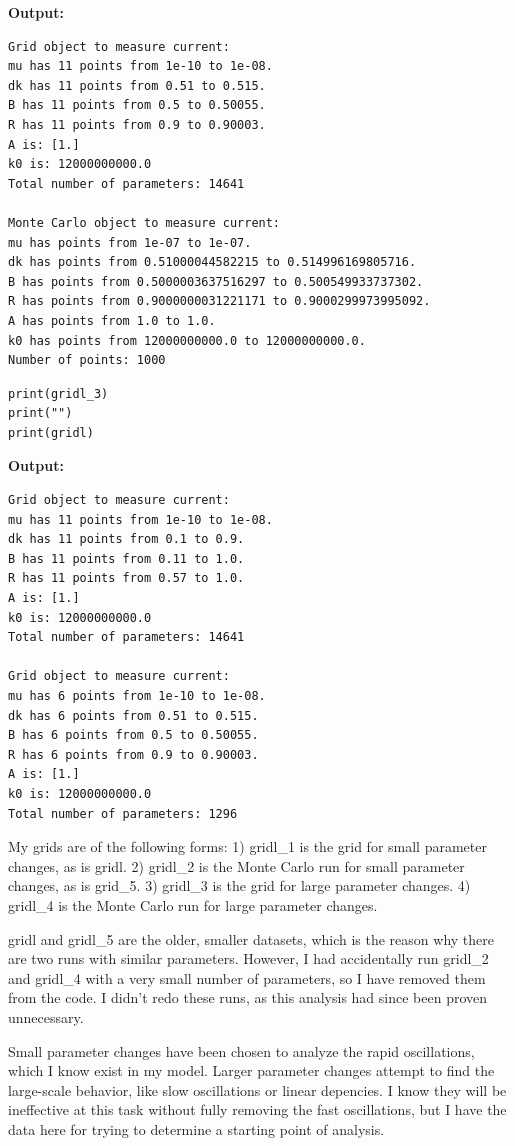 \documentclass{article}
\begin{document}
\textbf{Output:}\begin{verbatim}
Grid object to measure current:
mu has 11 points from 1e-10 to 1e-08.
dk has 11 points from 0.51 to 0.515.
B has 11 points from 0.5 to 0.50055.
R has 11 points from 0.9 to 0.90003.
A is: [1.]
k0 is: 12000000000.0
Total number of parameters: 14641

Monte Carlo object to measure current:
mu has points from 1e-07 to 1e-07.
dk has points from 0.51000044582215 to 0.514996169805716.
B has points from 0.5000003637516297 to 0.500549933737302.
R has points from 0.9000000031221171 to 0.9000299973995092.
A has points from 1.0 to 1.0.
k0 has points from 12000000000.0 to 12000000000.0.
Number of points: 1000

\end{verbatim}

\begin{lstlisting}
print(gridl_3)
print("")
print(gridl)\end{lstlisting}

\textbf{Output:}\begin{verbatim}
Grid object to measure current:
mu has 11 points from 1e-10 to 1e-08.
dk has 11 points from 0.1 to 0.9.
B has 11 points from 0.11 to 1.0.
R has 11 points from 0.57 to 1.0.
A is: [1.]
k0 is: 12000000000.0
Total number of parameters: 14641

Grid object to measure current:
mu has 6 points from 1e-10 to 1e-08.
dk has 6 points from 0.51 to 0.515.
B has 6 points from 0.5 to 0.50055.
R has 6 points from 0.9 to 0.90003.
A is: [1.]
k0 is: 12000000000.0
Total number of parameters: 1296

\end{verbatim}

My grids are of the following forms:
 1) gridl\_1 is the grid for small parameter changes, as is gridl.
 2) gridl\_2 is the Monte Carlo run for small parameter changes, as is grid\_5.
 3) gridl\_3 is the grid for large parameter changes.
 4) gridl\_4 is the Monte Carlo run for large parameter changes.

gridl and gridl\_5 are the older, smaller datasets, which is the reason why there are two runs with similar parameters. However, I had accidentally run gridl\_2 and gridl\_4 with a very small number of parameters, so I have removed them from the code. I didn't redo these runs, as this analysis had since been proven unnecessary. 

Small parameter changes have been chosen to analyze the rapid oscillations, which I know exist in my model. Larger parameter changes attempt to find the large-scale behavior, like slow oscillations or linear depencies. I know they will be ineffective at this task without fully removing the fast oscillations, but I have the data here for trying to determine a starting point of analysis.
\end{document}
